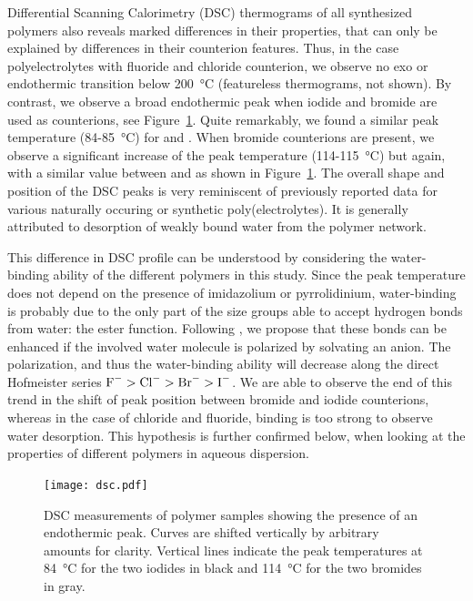 \documentclass[journal=jacsat,manuscript=article]{achemso}
\begin{document}
Differential Scanning Calorimetry (DSC) thermograms  of all synthesized polymers also reveals marked differences in their properties, that can only be explained by differences in their counterion features. Thus, in the case polyelectrolytes with fluoride and chloride counterion, we observe no exo or endothermic transition below \SI{200}{\celsius} (featureless thermograms, not shown). By contrast, we observe a broad endothermic peak when iodide and bromide are used as counterions, see Figure~\ref{fig:dsc}. Quite remarkably, we found a similar peak temperature (84-\SI{85}{\celsius}) for  and . When bromide counterions are present, we observe a significant increase of the peak temperature (114-\SI{115}{\celsius}) but again, with a similar value between  and  as shown in Figure~\ref{fig:dsc}. The overall shape and position of the DSC peaks is very reminiscent of previously reported data for various naturally occuring or synthetic poly(electrolytes)\cite{Li2005,Sarmento2006,Ostrowska-Czubenko2009a,Moin2015}. It is generally attributed to desorption of weakly bound water from the polymer network. %

This difference in DSC profile can be understood by considering the water-binding ability of the different polymers in this study. Since the peak temperature does not depend on the presence of imidazolium or pyrrolidinium, water-binding is probably due to the only part of the size groups able to accept hydrogen bonds from water: the ester function. Following \citet{Zhang2010a}, we propose that these bonds can be enhanced if the involved water molecule is polarized by solvating an anion. The polarization, and thus the water-binding ability will decrease along the direct Hofmeister series $\ce{F-}>\ce{Cl-}>\ce{Br-}>\ce{I-}$. We are able to observe the end of this trend in the shift of peak position between bromide and iodide counterions, whereas in the case of chloride and fluoride, binding is too strong to observe water desorption. This hypothesis is further confirmed below, when looking at the properties of different polymers in aqueous dispersion.

\begin{figure}
\texttt{[image: dsc.pdf]}
\caption{DSC measurements of polymer samples showing the presence of an endothermic peak. Curves are shifted vertically by arbitrary amounts for clarity. Vertical lines indicate the peak temperatures at \SI{84}{\celsius} for the two iodides in black and \SI{114}{\celsius} for the two bromides in gray.}
\label{fig:dsc}
\end{figure}
\end{document}
